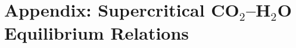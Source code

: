 \documentclass[12pt]{article}
\def\EQ#1\EN{\begin{equation}#1\end{equation}}
\begin{document}
 
    

%


\section*{Appendix: Supercritical CO$_2$--H$_2$O Equilibrium Relations}
\end{document}
